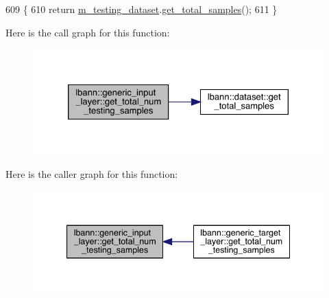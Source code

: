\begin{DoxyCode}
609                                                       \{
610     \textcolor{keywordflow}{return} \hyperlink{classlbann_1_1generic__input__layer_a66b9ec6b393695232bd98edc62fc1348}{m\_testing\_dataset}.\hyperlink{classlbann_1_1dataset_ad314847b347d413162a9d9eab759641f}{get\_total\_samples}();
611   \}
\end{DoxyCode}
Here is the call graph for this function\+:\nopagebreak
\begin{figure}[H]
\begin{center}
\leavevmode
\includegraphics[width=326pt]{classlbann_1_1generic__input__layer_ab5b5318cf000fbdaf35a3545335b60b2_cgraph}
\end{center}
\end{figure}
Here is the caller graph for this function\+:\nopagebreak
\begin{figure}[H]
\begin{center}
\leavevmode
\includegraphics[width=340pt]{classlbann_1_1generic__input__layer_ab5b5318cf000fbdaf35a3545335b60b2_icgraph}
\end{center}
\end{figure}
\mbox{\label{classlbann_1_1generic__input__layer_a5fc757d16e26739cd10e5eabafa6a32b}} 
